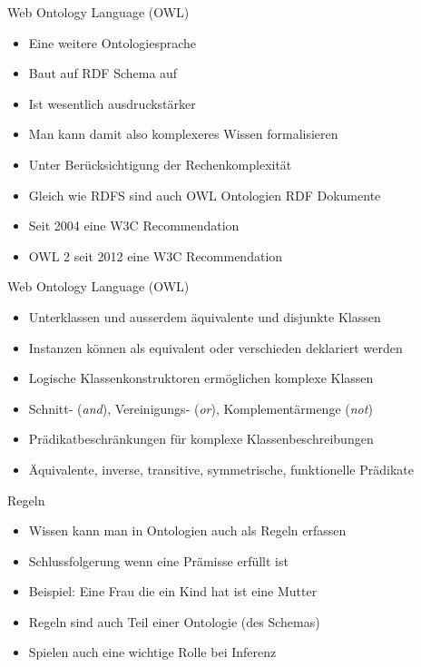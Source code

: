 \documentclass{beamer}
\begin{document}
\begin{frame}{Web Ontology Language (OWL)}
	
	\begin{itemize}
		\item Eine weitere Ontologiesprache
		\item Baut auf RDF Schema auf
		\item Ist wesentlich ausdruckstärker
		\item Man kann damit also komplexeres Wissen formalisieren
		\item Unter Berücksichtigung der Rechenkomplexität
		\item Gleich wie RDFS sind auch OWL Ontologien RDF Dokumente
		\item Seit 2004 eine W3C Recommendation
		\item OWL 2 seit 2012 eine W3C Recommendation
	\end{itemize}
	
\end{frame}

\begin{frame}{Web Ontology Language (OWL)}
	
	\begin{itemize}
		\item Unterklassen und ausserdem äquivalente und disjunkte Klassen
		\item Instanzen können als equivalent oder verschieden deklariert werden
		\item Logische Klassenkonstruktoren ermöglichen komplexe Klassen
		\item Schnitt- (\emph{and}), Vereinigungs- (\emph{or}), Komplementärmenge (\emph{not})
		\item Prädikatbeschränkungen für komplexe Klassenbeschreibungen
		\item Äquivalente, inverse, transitive, symmetrische, funktionelle Prädikate
	\end{itemize}
	
\end{frame}

\begin{frame}{Regeln}
	
	\begin{itemize}
		\item Wissen kann man in Ontologien auch als Regeln erfassen
		\item Schlussfolgerung wenn eine Prämisse erfüllt ist
		\item Beispiel: Eine Frau die ein Kind hat ist eine Mutter
		\item Regeln sind auch Teil einer Ontologie (des Schemas)
		\item Spielen auch eine wichtige Rolle bei Inferenz
	\end{itemize}
	
\end{frame}
\end{document}
